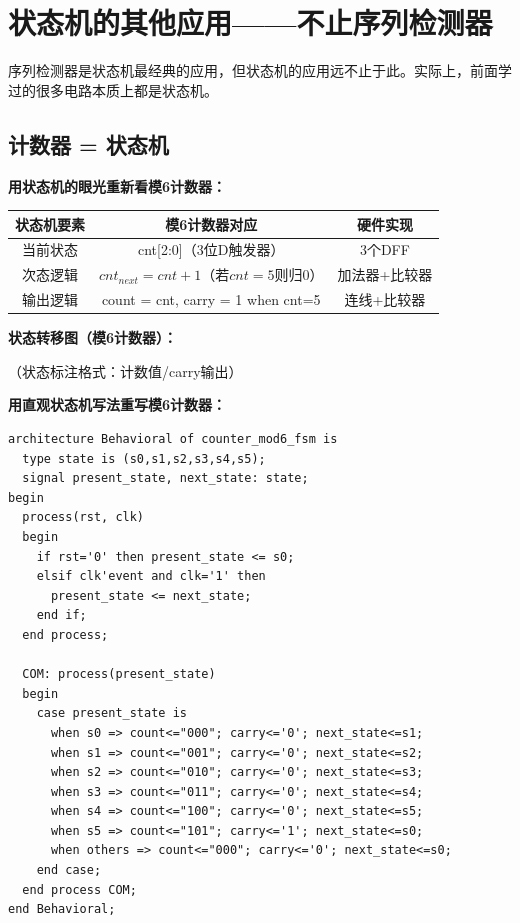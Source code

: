 \section{状态机的其他应用——不止序列检测器}

序列检测器是状态机最经典的应用，但状态机的应用远不止于此。实际上，前面学过的很多电路本质上都是状态机。

\subsection{计数器 = 状态机}

\textbf{用状态机的眼光重新看模6计数器：}

\begin{center}
\begin{tabular}{|c|c|c|}
\hline
\textbf{状态机要素} & \textbf{模6计数器对应} & \textbf{硬件实现} \\
\hline
当前状态 & cnt[2:0]（3位D触发器）& 3个DFF \\
次态逻辑 & $cnt_{next} = cnt + 1$（若$cnt=5$则归0）& 加法器+比较器 \\
输出逻辑 & count = cnt, carry = 1 when cnt=5 & 连线+比较器 \\
\hline
\end{tabular}
\end{center}

\textbf{状态转移图（模6计数器）：}

\begin{center}
\end{center}
（状态标注格式：计数值/carry输出）

\textbf{用直观状态机写法重写模6计数器：}

\begin{lstlisting}[caption={模6计数器——每个状态一行，输出和下一拍一起写}]
architecture Behavioral of counter_mod6_fsm is
  type state is (s0,s1,s2,s3,s4,s5);
  signal present_state, next_state: state;
begin
  process(rst, clk)
  begin
    if rst='0' then present_state <= s0;
    elsif clk'event and clk='1' then
      present_state <= next_state;
    end if;
  end process;

  COM: process(present_state)
  begin
    case present_state is
      when s0 => count<="000"; carry<='0'; next_state<=s1;
      when s1 => count<="001"; carry<='0'; next_state<=s2;
      when s2 => count<="010"; carry<='0'; next_state<=s3;
      when s3 => count<="011"; carry<='0'; next_state<=s4;
      when s4 => count<="100"; carry<='0'; next_state<=s5;
      when s5 => count<="101"; carry<='1'; next_state<=s0;
      when others => count<="000"; carry<='0'; next_state<=s0;
    end case;
  end process COM;
end Behavioral;
\end{lstlisting}

